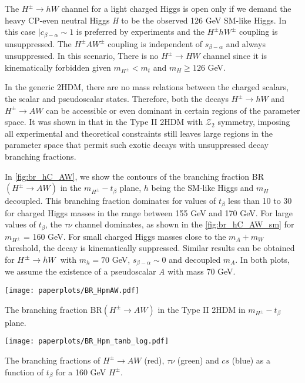 The $H^{\pm}\rightarrow hW$ channel for a light charged Higgs is open only if we demand the heavy CP-even neutral Higgs \emph{H} to be the observed 126 GeV SM-like Higgs. In this case $|c_{\beta-\alpha} \sim 1$ is preferred by experiments and the $H^{\pm}hW^{\pm}$ coupling is unsuppressed. The $H^{\pm} A W^{\pm}$ coupling is independent of $s_{\beta-\alpha}$ and always unsuppressed. In this scenario, There is no $H^{\pm} \rightarrow HW$ channel since it is kinematically forbidden given $m_{H^{\pm}}<m_t$ and $m_{H}\geq126$ GeV.

In the generic 2HDM, there are no mass relations between the charged scalars, the scalar and pseudoscalar states. Therefore, both the decays $H^{\pm} \rightarrow h W$ and $H^{\pm} \rightarrow A W$ can be accessible or even dominant in certain regions of the parameter space. It was shown in \cite{Coleppa:2013dya} that in the Type II 2HDM with $\mathcal{Z}_2$ symmetry, imposing all experimental and theoretical constraints still leaves large regions in the parameter space that permit such exotic decays with unsuppressed decay branching fractions. 

In \autoref{fig:br_hC_AW}, we show the contours of the branching fraction BR$(H^{\pm} \rightarrow A W)$ in the $m_{H^{\pm}}-t_{\beta}$ plane, $h$ being the SM-like Higgs and $m_{H}$ decoupled. This branching fraction dominates for values of $t_{\beta}$ less than 10 to 30 for charged Higgs masses in the range between 155 GeV and 170 GeV. For large values of $t_{\beta}$, the $\tau\nu$ channel dominates, as shown in the \autoref{fig:br_hC_AW_sm} for $m_{H^{\pm}}$ = 160 GeV. For small charged Higgs masses close to the $m_A + m_W$ threshold, the decay is kinematically suppressed. Similar results can be obtained for $H^{\pm} \rightarrow h W$ with $m_{h} = 70$ GeV,  $s_{\beta-\alpha}\sim 0$ and decoupled $m_A$. In both plots, we assume the existence of a pseudoscalar \emph{A} with mass 70 GeV.

\begin{marginfigure}[-8cm]
 	\texttt{[image: paperplots/BR\_HpmAW.pdf]}
    \caption{The branching fraction BR$( H^{\pm} \rightarrow AW)$ in the Type II 2HDM in $m_{H^\pm}-t_{\beta}$ plane.}
    \label{fig:br_hC_AW}
\end{marginfigure}

\begin{marginfigure}
 	\texttt{[image: paperplots/BR\_Hpm\_tanb\_log.pdf]}
\caption{The branching fractions of $H^{\pm} \rightarrow AW$ (red), $\tau\nu$ (green) and $cs$ (blue) as a function of $t_{\beta}$ for a 160 GeV $H^{\pm}$.}
\label{fig:br_hC_AW_sm}
\end{marginfigure}
 
